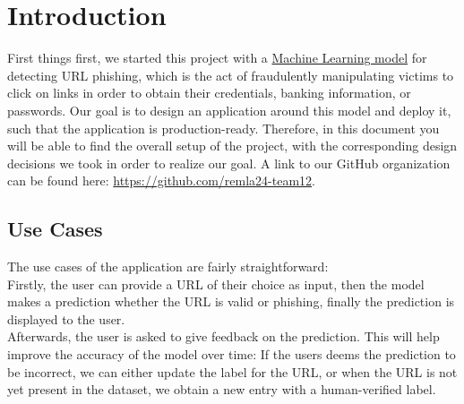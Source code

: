 \section{Introduction}
First things first, we started this project with a {\color{blue}\href{https://www.kaggle.com/code/luiscruz/phishing-detection-cnn?scriptVersionId=173193829}{Machine Learning model}} for detecting URL phishing, which is the act of fraudulently manipulating victims to click on links in order to obtain their credentials, banking information, or passwords. Our goal is to design an application around this model and deploy it, such that the application is production-ready. 
Therefore, in this document you will be able to find the overall setup of the project, with the corresponding design decisions we took in order to realize our goal. A link to our GitHub organization can be found here:
{\color{blue} \url{https://github.com/remla24-team12}}.

\subsection{Use Cases}
The use cases of the application are fairly straightforward: \\
Firstly, the user can provide a URL of their choice as input, then the model makes a prediction whether the URL is valid or phishing, finally the prediction is displayed to the user. \\
Afterwards, the user is asked to give feedback on the prediction. This will help improve the accuracy of the model over time: If the users deems the prediction to be incorrect, we can either update the label for the URL, or when the URL is not yet present in the dataset, we obtain a new entry with a human-verified label. 

